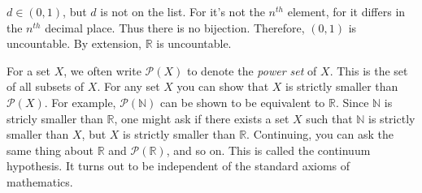\documentclass[crop=false,class=book,oneside]{standalone}
\begin{document}
            $d\in(0,1)$, but $d$ is not on the list. For it's not
            the $n^{th}$ element, for it differs in the
            $n^{th}$ decimal place. Thus there is no bijection.
            Therefore, $(0,1)$ is uncountable. By extension,
            $\mathbb{R}$ is uncountable.
            \par\hfill\par
            \vspace{-2ex}
            For a set $X$, we often write
            $\mathcal{P}(X)$ to denote the
            \textit{power set} of $X$. This is the
            set of all subsets of $X$.
            For any set $X$ you can show that $X$ is
            strictly smaller than $\mathcal{P}(X)$.
            For example, $\mathcal{P}(\mathbb{N})$
            can be shown to be equivalent to $\mathbb{R}$.
            Since $\mathbb{N}$ is stricly smaller than
            $\mathbb{R}$, one might ask if there exists
            a set $X$ such that $\mathbb{N}$ is strictly
            smaller than $X$, but $X$ is strictly smaller
            than $\mathbb{R}$. Continuing, you can ask the
            same thing about $\mathbb{R}$ and
            $\mathcal{P}(\mathbb{R})$, and so on.
            This is called the continuum hypothesis.
            It turns out to be independent of
            the standard axioms of mathematics.
\end{document}

